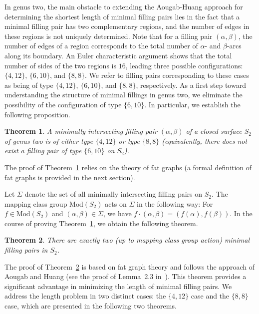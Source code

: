 \documentclass[11pt,reqno]{amsart}
\theoremstyle{plain}
\newtheorem{theorem}{Theorem}[section]
\theoremstyle{definition}
\theoremstyle{remark}
\numberwithin{equation}{section}
\numberwithin{figure}{section}
\begin{document}
In genus two, the main obstacle to extending the Aougab-Huang approach for determining the shortest length of minimal filling pairs lies in the fact that a minimal filling pair has two complementary regions, and the number of edges in these regions is not uniquely determined. Note that for a filling pair $(\alpha, \beta)$, the number of edges of a region corresponds to the total number of $\alpha$- and $\beta$-arcs along its boundary. An Euler characteristic argument shows that the total number of sides of the two regions is $16$, leading three possible configurations: $\{4,12\}$, $\{6,10\}$, and $\{8,8\}$. We refer to filling pairs corresponding to these cases as being of type $\{4,12\}$, $\{6,10\}$, and $\{8,8\}$, respectively. As a first step toward understanding the structure of minimal fillings in genus two, we eliminate the possibility of the configuration of type $\{6,10\}$. In particular, we establish the following proposition.


\begin{theorem}\label{prop1.1}
   A minimally intersecting filling pair $(\alpha, \beta)$ of a closed surface $S_2$ of genus two is of either type $\{4, 12\}$ or type $\{8,8\}$ (equivalently, there does not exist a filling pair of type $\{6,10\}$ on $S_2$).
\end{theorem}

The proof of Theorem~\ref{prop1.1} relies on the theory of fat graphs (a formal definition of fat graphs is provided in the next section). 

Let $\Sigma$ denote the set of all minimally intersecting filling pairs on $S_2$. The mapping class group $\mathrm{Mod}(S_2)$ acts on $\Sigma$ in the following way: For $f\in \mathrm{Mod}(S_2)$ and $(\alpha, \beta)\in \Sigma$, we have $f\cdot (\alpha, \beta)=(f(\alpha), f(\beta))$. In the course of proving Theorem~\ref{prop1.1}, we obtain the following theorem.


\begin{theorem}\label{thm1.2}
    There are exactly two (up to mapping class group action) minimal filling pairs in $S_2$.
\end{theorem}

The proof of Theorem~\ref{thm1.2} is based on fat graph theory and follows the approach of Aougab and Huang (see the proof of Lemma~2.3 in~\cite{AougabMinimally}). This theorem provides a significant advantage in minimizing the length of minimal filling pairs. We address the length problem in two distinct cases: the $\{4,12\}$ case and the $\{8,8\}$ case, which are presented in the following two theorems.
\end{document}
